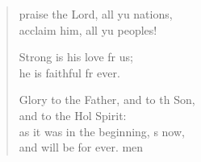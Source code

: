 \begin{verse}
  \begin{patverse}
     praise the Lord, all yu nations,\Med\\
acclaim him, all yu peoples!

Strong is his love fr us;\Med\\
he is faithful fr ever.

Glory to the Father, and to th Son,\Med\\
and to the Hol Spirit:\\
as it was in the beginning, \pointup{\i}s now,\Med\\
and will be for ever. men
  \end{patverse}
\end{verse}
